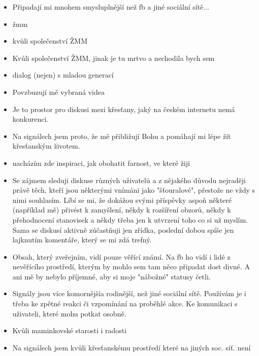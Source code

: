 \documentclass[12pt, a4paper, twoside]{article}
\begin{document}
\begin{itemize}
\item Připadají mi mnohem smysluplnější než fb a jiné sociální sítě...

\item žmm

\item kvůli společenství ŽMM

\item Kvůli společenství ŽMM, jinak je tu mrtvo a nechodila bych sem

\item dialog (nejen) s mladou generací

\item Povzbuzují mě vybraná videa

\item Je to prostor pro diskusi mezi křesťany, jaký na českém internetu nemá konkurenci.

\item Na signálech jsem proto, že mě přibližují Bohu a pomáhají mi lépe žít křesťanským životem.

\item nacházím zde inspiraci, jak obohatit farnost, ve které žiji

\item Se zájmem sleduji diskuse různých uživatelů a z nějakého důvodu nejraději právě těch, kteří jsou některými vnímáni jako "šťouralové", přestože ne vždy s nimi souhlasím. Líbí se mi, že dokážou svými příspěvky aspoň některé (například mě) přivést k zamyšlení, někdy k rozšíření obzorů, někdy k přehodnocení stanovisek a někdy třeba jen k utvrzení toho co si už myslím. Sama se diskusí aktivně zúčastňuji jen zřídka, poslední dobou spíše jen lajknutím komentáře, který se mi zdá trefný.

\item Obsah, který zveřejním, vidí pouze věřící známí. Na fb ho vidí i lidé z nevěřícího prostředí, kterým by mohlo sem tam něco připadat dost divné. A ani mě by nebylo příjemné, aby si moje "nábožné" statusy četli.

\item Signály jsou více komornějšía  rodinější, než jiné sociální sítě. Používám je i třeba ke zpětné reakci či vzpomínání na proběhlé akce. Ke komunikaci s uživateli, které mohu potkat osobně.

\item Kvůli maminkovské starosti i radosti

\item Na signálech jsem kvůli křesťanskému prostředí které na jiných soc. síť. není


\end{itemize}
\end{document}
